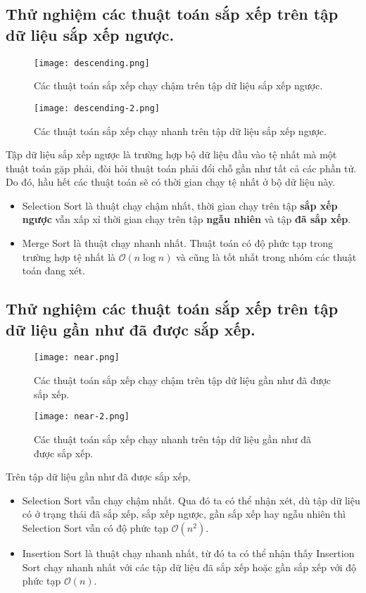 \documentclass[]{article}
\begin{document}
\subsection{Thử nghiệm các thuật toán sắp xếp trên tập dữ liệu sắp xếp ngược.}
\begin{figure}[H]
\centering
\texttt{[image: descending.png]}
\caption{Các thuật toán sắp xếp chạy chậm trên tập dữ liệu sắp xếp ngược.}
\end{figure}
\begin{figure}[H]
\centering
\texttt{[image: descending-2.png]}
\caption{Các thuật toán sắp xếp chạy nhanh trên tập dữ liệu sắp xếp ngược.}
\end{figure}
Tập dữ liệu sắp xếp ngược là trường hợp bộ dữ liệu đầu vào tệ nhất mà một thuật toán gặp phải, đòi hỏi thuật toán phải đổi chỗ gần như tất cả các phần tử. Do đó, hầu hết các thuật toán sẽ có thời gian chạy tệ nhất ở bộ dữ liệu này.
\begin{itemize}
\item Selection Sort là thuật chạy chậm nhất, thời gian chạy trên tập \textbf{sắp xếp ngược} vẫn xấp xỉ thời gian chạy trên tập \textbf{ngẫu nhiên} và tập \textbf{đã sắp xếp}.
\item Merge Sort là thuật chạy nhanh nhất. Thuật toán có độ phức tạp trong trường hợp tệ nhất là $\mathcal{O}(n \log n)$ và cũng là tốt nhất trong nhóm các thuật toán đang xét.
\end{itemize}

\subsection{Thử nghiệm các thuật toán sắp xếp trên tập dữ liệu gần như đã được sắp xếp.}
\begin{figure}[H]
\centering
\texttt{[image: near.png]}
\caption{Các thuật toán sắp xếp chạy chậm trên tập dữ liệu gần như đã được sắp xếp.}
\end{figure}
\begin{figure}[H]
\centering
\texttt{[image: near-2.png]}
\caption{Các thuật toán sắp xếp chạy nhanh trên tập dữ liệu gần như đã được sắp xếp.}
\end{figure}
Trên tập dữ liệu gần như đã được sắp xếp,
\begin{itemize}
\item Selection Sort vẫn chạy chậm nhất. Qua đó ta có thể nhận xét, dù tập dữ liệu có ở trạng thái đã sắp xếp, sắp xếp ngược, gần sắp xếp hay ngẫu nhiên thì Selection Sort vẫn có độ phức tạp $\mathcal{O}(n^2)$.
\item Insertion Sort là thuật chạy nhanh nhất, từ đó ta có thể nhận thấy Insertion Sort chạy nhanh nhất với các tập dữ liệu đã sắp xếp hoặc gần sắp xếp với độ phức tạp $\mathcal{O}(n)$.
\end{itemize}
\end{document}
